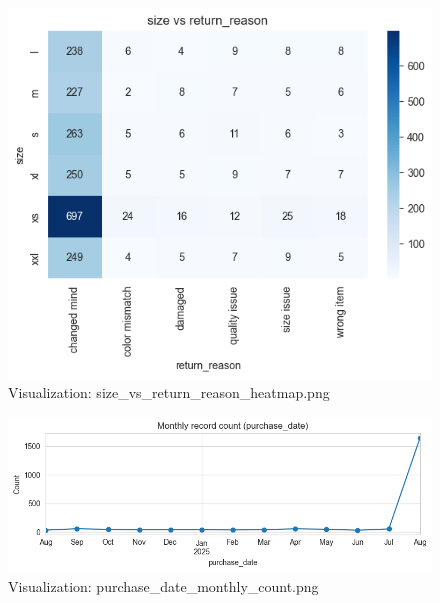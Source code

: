 \documentclass{article}%
\begin{document}
\vspace{10pt}%
\\%
\begin{minipage}[c]{0.48\textwidth}%


\begin{figure}[H]%
\centering%
\includegraphics[width=\linewidth]{output/plots/size_vs_return_reason_heatmap.png}%
\caption{Visualization: size\_vs\_return\_reason\_heatmap.png}%
\end{figure}

%
\end{minipage}%
\begin{minipage}[c]{0.48\textwidth}%


\begin{figure}[H]%
\centering%
\includegraphics[width=\linewidth]{output/plots/purchase_date_monthly_count.png}%
\caption{Visualization: purchase\_date\_monthly\_count.png}%
\end{figure}

%
\end{minipage}%
\end{document}
